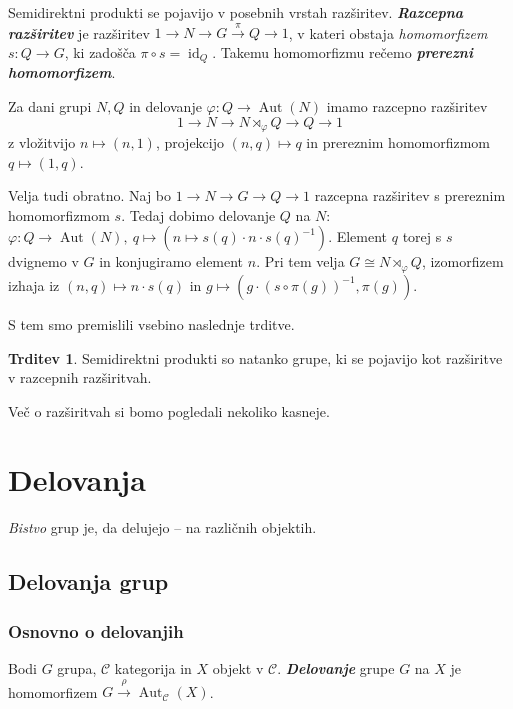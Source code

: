 \documentclass[11pt]{book}
\DeclareMathOperator\Aut{Aut}
\DeclareMathOperator\id{id}
\def\definicija{\color{rdeca}\bf\em}
\theoremstyle{definition}
\theoremstyle{zgled}
\theoremstyle{odprtproblem}
\theoremstyle{domacanaloga}
\theoremstyle{izrek}
\newtheorem*{trditev}{Trditev}
\begin{document}
Semidirektni produkti se pojavijo v posebnih vrstah razširitev. {\definicija Razcepna razširitev} je razširitev $1 \to N \to G \xrightarrow{\pi} Q \to 1$, v kateri obstaja {\em homomorfizem} $s \colon Q \to G$, ki zadošča $\pi \circ s = \id_Q$. Takemu homomorfizmu rečemo {\definicija prerezni homomorfizem}. 

Za dani grupi $N,Q$ in delovanje $\varphi \colon Q \to \Aut(N)$ imamo razcepno razširitev
\[
1 \to N \to N \rtimes_{\varphi} Q \to Q \to 1
\]
z vložitvijo $n \mapsto (n,1)$, projekcijo $(n,q) \mapsto q$ in prereznim homomorfizmom $q \mapsto (1,q)$.

Velja tudi obratno. Naj bo $1 \to N \to G \to Q \to 1$ razcepna razširitev s prereznim homomorfizmom $s$. Tedaj dobimo delovanje $Q$ na $N$: $\varphi \colon Q \to \Aut(N), \ q \mapsto (n \mapsto s(q) \cdot n \cdot s(q)^{-1})$. Element $q$ torej s $s$ dvignemo v $G$ in konjugiramo element $n$. Pri tem velja $G \cong N \rtimes_{\varphi} Q$, izomorfizem izhaja iz $(n,q) \mapsto n \cdot s(q)$ in $g \mapsto (g \cdot (s \circ \pi(g))^{-1},\pi(g))$. 

S tem smo premislili vsebino naslednje trditve.

\begin{trditev}
Semidirektni produkti so natanko grupe, ki se pojavijo kot razširitve v razcepnih razširitvah.
\end{trditev}

Več o razširitvah si bomo pogledali nekoliko kasneje.

\chapter{Delovanja}

{\em Bistvo} grup je, da delujejo -- na različnih objektih.

\section{Delovanja grup}

\subsection{Osnovno o delovanjih}

Bodi $G$ grupa, $\mathcal{C}$ kategorija in $X$ objekt v $\mathcal{C}$. {\definicija Delovanje} grupe $G$ na $X$ je homomorfizem $G \xrightarrow{\rho} \Aut_{\mathcal{C}}(X)$.
\end{document}
